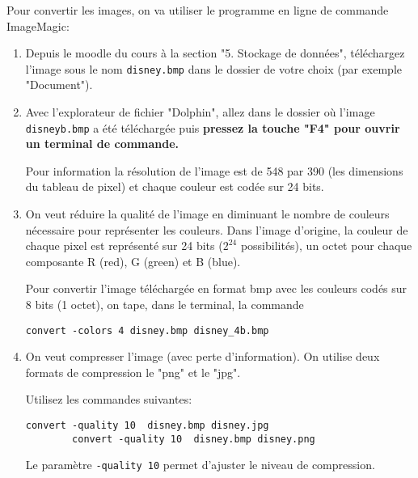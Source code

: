 \documentclass[a4paper,12pt, twoside]{article}
\begin{document}
Pour convertir les images, on va utiliser le programme en ligne de commande ImageMagic:
\begin{enumerate}
	\item Depuis le moodle du cours à la section "5. Stockage de données", téléchargez l’image sous le nom \texttt{disney.bmp} dans le dossier de votre choix (par exemple "Document"). 
	\item Avec l'explorateur de fichier "Dolphin", allez dans le dossier où l'image \texttt{disneyb.bmp} a été téléchargée puis \textbf{pressez la touche "F4" pour ouvrir un terminal de commande.}
	
	Pour information la résolution de l'image est de 548 par 390 (les dimensions du tableau de pixel) et chaque couleur est codée sur 24 bits.
	
	\item On veut réduire la qualité de l'image en diminuant le nombre de couleurs nécessaire pour représenter les couleurs. Dans l'image d'origine, la couleur de chaque pixel est représenté sur 24 bits ($2^24$ possibilités), un octet pour chaque composante R (red), G (green) et B (blue).	
	
	\vspace{2mm}
	
	Pour convertir l'image téléchargée en format bmp avec les couleurs codés sur 8 bits (1 octet), on tape, dans le terminal, la commande
	\begin{lstlisting}[numbers=none]
		convert -colors 4 disney.bmp disney_4b.bmp
	\end{lstlisting}
	
	\item On veut compresser l'image (avec perte d'information). On utilise deux formats de compression le "png" et le "jpg".
	
	\vspace{2mm}
	
	Utilisez les commandes suivantes:
	\begin{lstlisting}[numbers=none]
		convert -quality 10  disney.bmp disney.jpg
		convert -quality 10  disney.bmp disney.png
	\end{lstlisting}
	Le paramètre \lstinline{-quality 10} permet d'ajuster le niveau de compression.
	

\end{enumerate}
\end{document}
